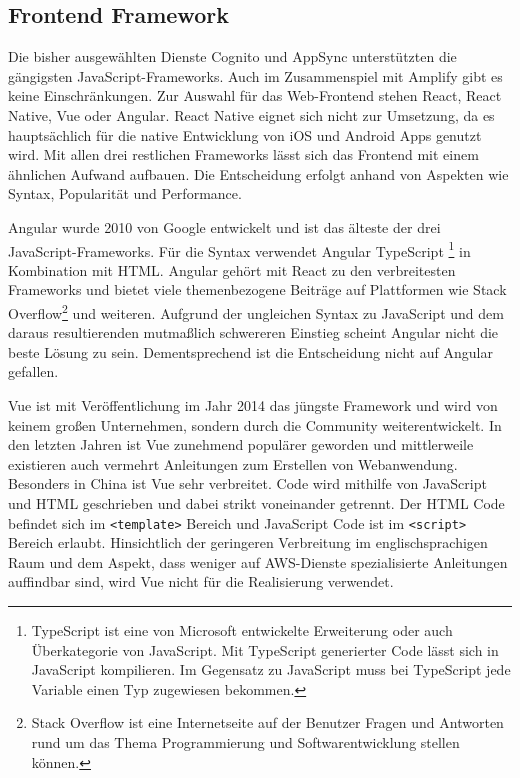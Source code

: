 {\subsection{Frontend Framework}
Die bisher ausgewählten Dienste Cognito und AppSync unterstützten die gängigsten JavaScript-Frameworks.
Auch im Zusammenspiel mit Amplify gibt es keine Einschränkungen.
Zur Auswahl für das Web-Frontend stehen React, React Native, Vue oder Angular.
React Native eignet sich nicht zur Umsetzung, da es hauptsächlich für die native Entwicklung von iOS und Android Apps genutzt wird.
Mit allen drei restlichen Frameworks lässt sich das Frontend mit einem ähnlichen Aufwand aufbauen.
Die Entscheidung erfolgt anhand von Aspekten wie Syntax, Popularität und Performance.

Angular wurde 2010 von Google entwickelt und ist das älteste der drei JavaScript-Frameworks.
Für die Syntax verwendet Angular TypeScript
\footnote{TypeScript ist eine von Microsoft entwickelte Erweiterung oder auch Überkategorie von JavaScript.
Mit TypeScript generierter Code lässt sich in JavaScript kompilieren. Im Gegensatz zu JavaScript muss bei TypeScript jede Variable einen Typ zugewiesen bekommen.
 } in Kombination mit HTML.
 Angular gehört mit React zu den verbreitesten Frameworks und bietet viele themenbezogene Beiträge auf Plattformen wie Stack Overflow\footnote{Stack Overflow ist eine Internetseite auf der Benutzer Fragen und Antworten rund um das Thema Programmierung und Softwarentwicklung stellen können. } und weiteren.
 Aufgrund der ungleichen Syntax zu JavaScript und dem daraus resultierenden mutmaßlich schwereren Einstieg scheint Angular nicht die beste Lösung zu sein.
 Dementsprechend ist die Entscheidung nicht auf Angular gefallen.

Vue ist mit Veröffentlichung im Jahr 2014 das jüngste Framework und wird von keinem großen Unternehmen, sondern durch die Community weiterentwickelt.
In den letzten Jahren ist Vue zunehmend populärer geworden und mittlerweile existieren auch vermehrt Anleitungen zum Erstellen von Webanwendung.
Besonders in China ist Vue sehr verbreitet.\cite[Abschnitt: Comparing Adoption \& Popularity]{JavascriptFrameworks}
Code wird mithilfe von JavaScript und HTML geschrieben und dabei strikt voneinander getrennt.
Der HTML Code befindet sich im \verb+<template>+ Bereich und JavaScript Code ist im \verb+<script>+ Bereich erlaubt.
Hinsichtlich der geringeren Verbreitung im englischsprachigen Raum und dem Aspekt, dass weniger auf AWS-Dienste spezialisierte Anleitungen auffindbar sind, wird Vue nicht für die Realisierung verwendet.

}
